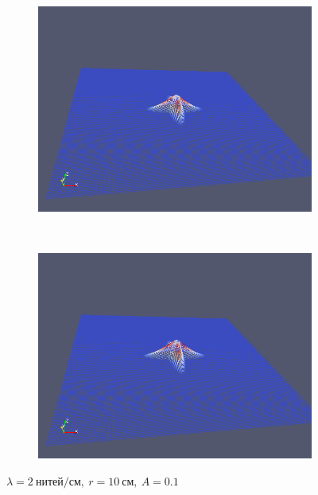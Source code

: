 \begin{figure}[H]
\begin{subfigure}[t]{0.5\textwidth}
        \includegraphics[width=\textwidth]{img/fiber/density_2_radius_10_amplitude_0.1/5.png}
    \end{subfigure}%
    ~
    \begin{subfigure}[t]{0.5\textwidth}
        \centering
        \includegraphics[width=\textwidth]{img/fiber/density_2_radius_10_amplitude_0.1/6.png}
    \end{subfigure}
    \caption{$\lambda=2~нитей/см,~r=10~см,~A=0.1$}
\end{figure}
